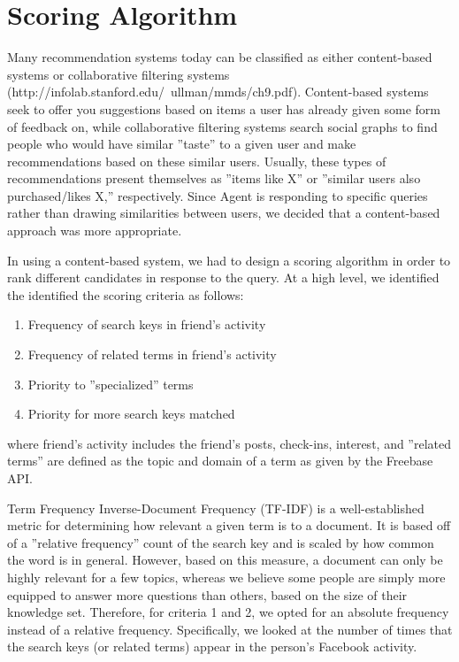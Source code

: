 \section{Scoring Algorithm}
\label{sec:scoring}

Many recommendation systems today can be classified as either content-based systems or collaborative filtering systems (http://infolab.stanford.edu/~ullman/mmds/ch9.pdf). Content-based systems seek to offer you suggestions based on items a user has already given some form of feedback on, while collaborative filtering systems search social graphs to find people who would have similar ''taste'' to a given user and make recommendations based on these similar users. Usually, these types of recommendations present themselves as ''items like X'' or ''similar users also purchased/likes X,'' respectively. Since Agent is responding to specific queries rather than drawing similarities between users, we decided that a content-based approach was more appropriate.

In using a content-based system, we had to design a scoring algorithm in order to rank different candidates in response to the query. At a high level, we identified the identified the scoring criteria as follows:
\begin{enumerate}
\item Frequency of search keys in friend's activity
\item Frequency of related terms in friend's activity
\item Priority to ''specialized'' terms
\item Priority for more search keys matched
\end{enumerate}
where friend's activity includes the friend's posts, check-ins, interest, 
and ''related terms'' are defined as the topic and domain of a term as given by the Freebase API.

Term Frequency Inverse-Document Frequency (TF-IDF)  is a well-established metric for determining how relevant a given term is to a document. It is based off of a ''relative frequency'' count of the search key and is scaled by how common the word is in general. However, based on this measure, a document can only be highly relevant for a few topics, whereas we believe some people are simply more equipped to answer more questions than others, based on the size of their knowledge set. Therefore, for criteria 1 and 2, we opted for an absolute frequency instead of a relative frequency. Specifically, we looked at the number of times that the search keys (or related terms) appear in the person's Facebook activity.

